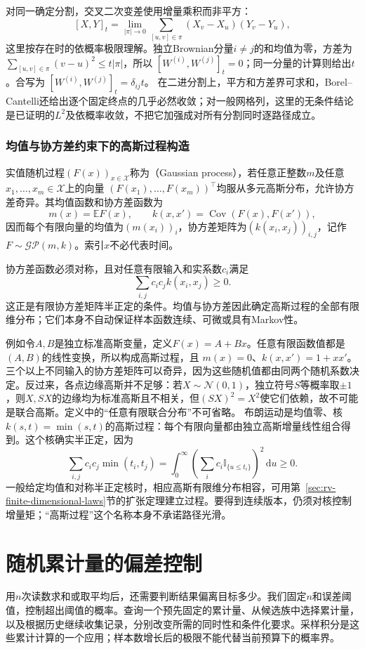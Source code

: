 对同一确定分割，交叉二次变差使用增量乘积而非平方：
\[
[X,Y]_t=\lim_{|\pi|\to0}\sum_{[u,v]\in\pi}
(X_v-X_u)(Y_v-Y_u),
\]
这里按存在时的依概率极限理解。独立Brownian分量\(i\ne j\)的和均值为零，方差为
\(\sum_{[u,v]\in\pi}(v-u)^2\leq t|\pi|\)，所以
\([W^{(i)},W^{(j)}]_t=0\)；同一分量的计算则给出\(t\)。合写为
\([W^{(i)},W^{(j)}]_t=\delta_{ij}t\)。
在二进分割上，平方和方差界可求和，Borel--Cantelli还给出逐个固定终点的几乎必然收敛；对一般网格列，这里的无条件结论是已证明的\(L^2\)及依概率收敛，不把它加强成对所有分割同时逐路径成立。

\subsubsection{均值与协方差约束下的高斯过程构造}
\begin{definition}[高斯过程]
  \label{def:stoch-gaussian-process}
  实值随机过程\((F(x))_{x\in\mathcal X}\)称为（Gaussian process），若任意正整数\(m\)及任意\(x_1,\ldots,x_m\in\mathcal X\)上的向量
  \((F(x_1),\ldots,F(x_m))^\top\)均服从多元高斯分布，允许协方差奇异。其均值函数和协方差函数为
  \[
    m(x)=\mathbb E F(x),\qquad
    k(x,x')=\operatorname{Cov}(F(x),F(x')),
  \]
  因而每个有限向量的均值为\((m(x_i))_i\)，协方差矩阵为\((k(x_i,x_j))_{i,j}\)，记作\(F\sim\mathcal{GP}(m,k)\)。索引\(x\)不必代表时间。
\end{definition}
协方差函数必须对称，且对任意有限输入和实系数\(c_i\)满足
\[
  \sum_{i,j}c_ic_jk(x_i,x_j)\geq0.
\]
这正是有限协方差矩阵半正定的条件。均值与协方差因此确定高斯过程的全部有限维分布；它们本身不自动保证样本函数连续、可微或具有Markov性。

例如令\(A,B\)是独立标准高斯变量，定义\(F(x)=A+Bx\)。任意有限函数值都是\((A,B)\)的线性变换，所以构成高斯过程，且
\(m(x)=0\)、\(k(x,x')=1+xx'\)。三个以上不同输入的协方差矩阵可以奇异，因为这些随机值都由同两个随机系数决定。反过来，各点边缘高斯并不足够：若\(X\sim\mathcal N(0,1)\)，独立符号\(S\)等概率取\(\pm1\)，则\(X,SX\)的边缘均为标准高斯且不相关，但\((SX)^2=X^2\)使它们依赖，故不可能是联合高斯。定义中的“任意有限联合分布”不可省略。
布朗运动是均值零、核\(k(s,t)=\min(s,t)\)的高斯过程：每个有限向量都由独立高斯增量线性组合得到。这个核确实半正定，因为
\[
\sum_{i,j}c_ic_j\min(t_i,t_j)
=\int_0^\infty\left(\sum_i c_i\mathbb I_{\{u\leq t_i\}}\right)^2\,\mathrm du\geq0.
\]
一般给定均值和对称半正定核时，相应高斯有限维分布相容，可用第~\ref{sec:rv-finite-dimensional-laws}节的扩张定理建立过程。要得到连续版本，仍须对核控制增量矩；“高斯过程”这个名称本身不承诺路径光滑。

\section{随机累计量的偏差控制}
\label{sec:probability-averages-errors}
\label{sec:rv-aggregation}
用\(n\)次读数求和或取平均后，还需要判断结果偏离目标多少。我们固定\(n\)和误差阈值，控制超出阈值的概率。查询一个预先固定的累计量、从候选族中选择累计量，以及根据历史继续收集记录，分别改变所需的同时性和条件化要求。采样积分是这些累计计算的一个应用；样本数增长后的极限不能代替当前预算下的概率界。

